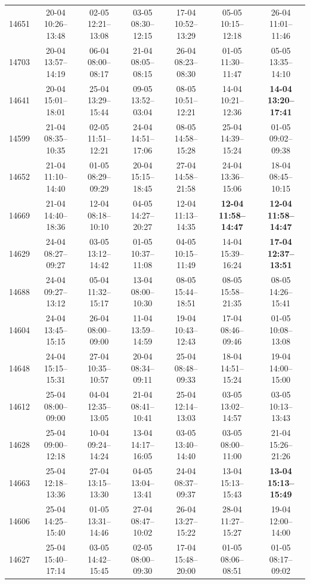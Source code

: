 \begin{table}[htbp]
\begin{tabular}{|r|c|c|c|c|c|c|}
14651 & 20-04 10:26--13:48 & 02-05 12:21--13:08 & 03-05 08:30--12:15 & 17-04 10:52--13:29 & 05-05 10:15--12:18 & 26-04 11:01--11:46 \\ 
14703 & 20-04 13:57--14:19 & 06-04 08:00--08:17 & 21-04 08:05--08:15 & 26-04 08:23--08:30 & 01-05 11:30--11:47 & 05-05 13:35--14:10 \\ 
14641 & 20-04 15:01--18:01 & 25-04 13:29--15:44 & 09-05 13:52--03:04 & 08-05 10:51--12:21 & 14-04 10:21--12:36 & \textbf{14-04 13:20--17:41} \\ 
14599 & 21-04 08:35--10:35 & 02-05 11:51--12:21 & 24-04 14:51--17:06 & 08-05 14:58--15:28 & 25-04 14:39--15:24 & 01-05 09:02--09:38 \\ 
14652 & 21-04 11:10--14:40 & 01-05 08:29--09:29 & 20-04 15:15--18:45 & 27-04 14:58--21:58 & 24-04 13:36--15:06 & 18-04 08:45--10:15 \\ 
14669 & 21-04 14:40--18:36 & 12-04 08:18--10:10 & 04-05 14:27--20:27 & 12-04 11:13--14:35 & \textbf{12-04 11:58--14:47} & \textbf{12-04 11:58--14:47} \\ 
14629 & 24-04 08:27--09:27 & 03-05 13:12--14:42 & 01-05 10:37--11:08 & 04-05 10:15--11:49 & 14-04 15:39--16:24 & \textbf{17-04 12:37--13:51} \\ 
14688 & 24-04 09:27--13:12 & 05-04 11:32--15:17 & 13-04 08:00--10:30 & 08-05 15:44--18:51 & 08-05 15:58--21:35 & 08-05 14:26--15:41 \\ 
14604 & 24-04 13:45--15:15 & 26-04 08:00--09:00 & 11-04 13:59--14:59 & 19-04 10:43--12:43 & 17-04 08:46--09:46 & 01-05 10:08--13:08 \\ 
14648 & 24-04 15:15--15:31 & 27-04 10:35--10:57 & 20-04 08:34--09:11 & 25-04 08:48--09:33 & 18-04 14:51--15:24 & 19-04 14:00--15:00 \\ 
14612 & 25-04 08:00--09:00 & 04-04 12:35--13:05 & 21-04 08:41--10:41 & 25-04 12:14--13:03 & 03-05 13:02--14:57 & 03-05 10:13--13:43 \\ 
14628 & 25-04 09:00--12:18 & 10-04 09:24--14:24 & 13-04 14:17--16:05 & 03-05 13:40--14:40 & 03-05 08:00--11:00 & 21-04 15:26--21:26 \\ 
14663 & 25-04 12:18--13:36 & 27-04 13:15--13:30 & 04-05 13:04--13:41 & 24-04 08:37--09:37 & 13-04 15:13--15:43 & \textbf{13-04 15:13--15:49} \\ 
14606 & 25-04 14:25--15:40 & 01-05 13:31--14:46 & 27-04 08:47--10:02 & 26-04 13:27--15:22 & 28-04 11:27--15:27 & 19-04 12:00--14:00 \\ 
14627 & 25-04 15:40--17:14 & 03-05 14:42--15:45 & 02-05 08:00--09:30 & 17-04 15:48--20:00 & 01-05 08:06--08:51 & 01-05 08:17--09:02 \\ 

\end{tabular}
\end{table}

